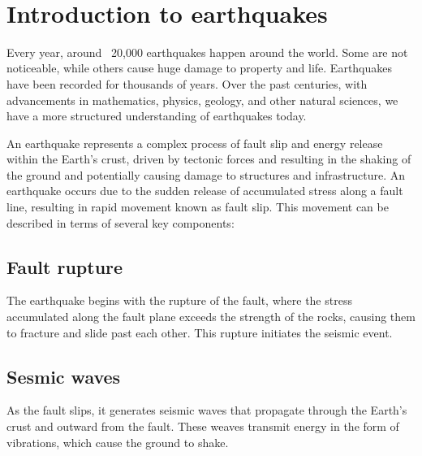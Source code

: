 ~\\

\section{Introduction to earthquakes}
Every year, around ~20,000 earthquakes happen around the world. Some are not noticeable, while others cause huge damage to property and life.
Earthquakes have been recorded for thousands of years. 
Over the past centuries, with advancements in mathematics, physics, geology, and other natural sciences, we have a more structured understanding of earthquakes today.

An earthquake represents a complex process of fault slip and energy release within the Earth's crust, driven by tectonic forces and resulting in the shaking of the ground and potentially causing damage to structures and infrastructure. 
An earthquake occurs due to the sudden release of accumulated stress along a fault line, resulting in rapid movement known as fault slip. This movement can be described in terms of several key components:

\subsection{Fault rupture}
The earthquake begins with the rupture of the fault, where the stress accumulated along the fault plane exceeds the strength of the rocks, causing them to fracture and slide past each other. This rupture initiates the seismic event.

\subsection{Sesmic waves} 
As the fault slips, it generates seismic waves that propagate through the Earth's crust and outward from the fault.
These weaves transmit energy in the form of vibrations, which cause the ground to shake.

